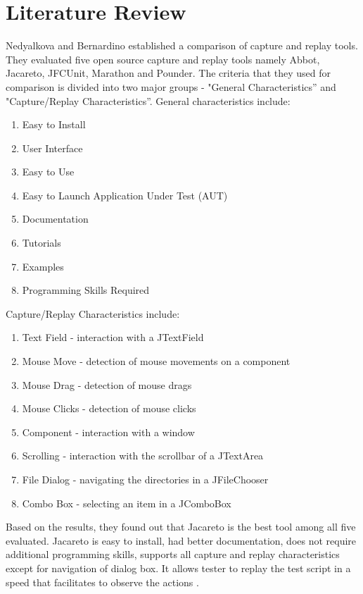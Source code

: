 \documentclass[12pt,journal]{IEEEtran}
\begin{document}
\section{Literature Review}
Nedyalkova and  Bernardino \cite{paper} established a comparison of capture and replay tools. They evaluated five open source capture and replay tools namely Abbot, Jacareto, JFCUnit, Marathon and Pounder. The criteria that they used for comparison is divided into two major groups - "General Characteristics'' and "Capture/Replay Characteristics''. General characteristics include:
\begin{enumerate}
\item Easy to Install
\item User Interface
\item Easy to Use
\item Easy to Launch Application Under Test (AUT)
\item Documentation
\item Tutorials
\item Examples
\item Programming Skills Required
\end{enumerate}
Capture/Replay Characteristics include:
\begin{enumerate}
\item Text Field - interaction with a JTextField
\item Mouse Move - detection of mouse movements on a component
\item Mouse Drag - detection of mouse drags
\item Mouse Clicks - detection of mouse clicks
\item Component - interaction with a window
\item Scrolling - interaction with the scrollbar of a JTextArea
\item File Dialog - navigating the directories in a JFileChooser
\item Combo Box - selecting an item in a JComboBox
\end{enumerate}
Based on the results, they found out that Jacareto is the best tool among all five evaluated. Jacareto is easy to install, had better documentation, does not require additional programming skills, supports all capture and replay characteristics except for navigation of dialog box. It allows tester to replay the test script in a speed that facilitates to observe the actions \cite{paper}.
\end{document}
